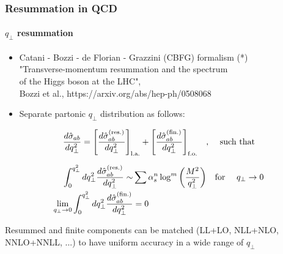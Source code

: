 \documentclass[aspectratio=43]{beamer}
\begin{document}
\begin{frame}

	\frametitle{Resummation in QCD}
	\framesubtitle{$q_{\perp}$ resummation}

	\footnotesize
	
	\begin{itemize}
		\item Catani - Bozzi - de Florian - Grazzini (CBFG) formalism (*) \\
		{\color{blue}"Transverse-momentum resummation and the spectrum\\
			of the Higgs boson at the LHC",\\
		Bozzi et al., https://arxiv.org/abs/hep-ph/0508068}
		\item Separate partonic $q_{\perp}$ distribution as follows:
	\end{itemize}
	
	\begin{equation}
		\frac{d\hat{\sigma}_{ab}}{dq_{\perp}^{2}} =
		\Bigg[ \frac{d\hat{\sigma}^{\textrm{(res.)}}_{ab}}{dq_{\perp}^{2}} \Bigg]_{\textrm{l.a.}} + 
		\Bigg[ \frac{d\hat{\sigma}^{\textrm{(fin.)}}_{ab}}{dq_{\perp}^{2}} \Bigg]_{\textrm{f.o.}} \textrm{\quad, \quad such that} \nonumber
	\end{equation}

	\begin{align}
		\int_{0}^{q_{\perp}^{2}} dq_{\perp}^{2} \frac{d\hat{\sigma}^{\textrm{(res.)}}_{ab}}{dq_{\perp}^{2}} \sim & \sum \alpha_{s}^{n} \log^{m} \bigg( \frac{M^{2}}{q_{\perp}^{2}} \bigg) \textrm{\quad for \quad} q_{\perp} \rightarrow 0 \nonumber \\
		\lim_{q_{\perp} \rightarrow 0}\int_{0}^{q_{\perp}^{2}} dq_{\perp}^{2} \frac{d\hat{\sigma}^{\textrm{(fin.)}}_{ab}}{dq_{\perp}^{2}} &= 0 \nonumber 
	\end{align}

	Resummed and finite components can be matched (LL+LO, NLL+NLO,\\ NNLO+NNLL, ...) to have uniform accuracy in a wide range of $q_{\perp}$
	
\end{frame}
\end{document}
